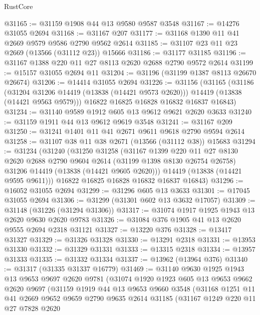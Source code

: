 \begin{lexlean}{RustCore}
\begin{coremodule}
@31165 := @31159 @1908 @44 @13 @9580 @9587 @3548
@31167 := @14276 @31055 @2694
@31168 := @31167 @207
@31177 := @31168 @1390 @11 @41 @2669 @9579 @9586 @2790 @9562 @2614
@31185 := @31107 @23 @11 @23 @2669 (@13566 (@31112 @23)) @15666
@31186 := @31177 @31185
@31196 := @31167 @1388 @220 @11 @27 @8113 @2620 @2688 @2790 @9572 @2614
@31199 := @15157 @31055 @2694 @11
@31204 := @31196 (@31199 @1387 @8113 @26670 @26674)
@31206 := @14414 @31055 @2694
@31226 := @31156
    (@31165
      (@31186
        (@31204 @31206 @14419 (@13838 (@14421 @9573 @2620)))
        @14419
        (@13838 (@14421 @9563 @9579)))
      @16822
      @16825
      @16828
      @16832
      @16837
      @16843)
@31234 := @31140 @9589 @1912 @605 @13 @9612 @9621 @2620 @3633
@31240 := @31159 @1911 @44 @13 @9612 @9619 @3548
@31241 := @31167 @209
@31250 := @31241 @1401 @11 @41 @2671 @9611 @9618 @2790 @9594 @2614
@31258 := @31107 @38 @11 @38 @2671 (@13566 (@31112 @38)) @15683
@31294 := @31234
    (@31240
      (@31250
        @31258
        (@31167
          @1399
          @220
          @11
          @27
          @8130
          @2620
          @2688
          @2790
          @9604
          @2614
          (@31199 @1398 @8130 @26754 @26758)
          @31206
          @14419
          (@13838 (@14421 @9605 @2620)))
        @14419
        (@13838 (@14421 @9595 @9611)))
      @16822
      @16825
      @16828
      @16832
      @16837
      @16843)
@31296 := @16052 @31055 @2694
@31299 := @31296 @605 @13 @3633
@31301 := @17045 @31055 @2694
@31306 := @31299 (@31301 @602 @13 @3632 @17057)
@31309 := @31148 (@31226 (@31294 @31306))
@31317 := @31074 @1917 @1925 @1943 @13 @2620 @9630 @2620 @9783
@31326 := @31084 @376 @1905 @41 @13 @2620 @9555 @2694 @2318 @31121
@31327 := @13220 @376
@31328 := @13417 @31327
@31329 := @31326 @31328
@31330 := @13291 @2318
@31331 := @13953 @31330
@31332 := @31329 @31331
@31333 := @13315 @2318
@31334 := @13957 @31333
@31335 := @31332 @31334
@31337 := @13962 (@13964 @376)
@31340 := @31317 (@31335 @31337 @16779)
@31469 := @31140
    @9630
    @1925
    @1943
    @13
    @9653
    @9697
    @2620
    @9781
    (@31074
      @1920
      @1923
      @605
      @13
      @9653
      @9662
      @2620
      @9697
      (@31159
        @1919
        @44
        @13
        @9653
        @9660
        @3548
        (@31168
          @1251
          @11
          @41
          @2669
          @9652
          @9659
          @2790
          @9635
          @2614
          @31185
          (@31167
            @1249
            @220
            @11
            @27
            @7828
            @2620

\end{coremodule}
\end{lexlean}
